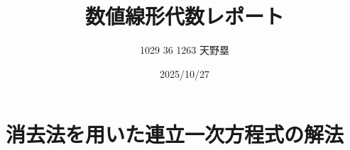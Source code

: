 \documentclass[uplatex,a4j]{jsarticle}
\title{数値線形代数レポート}
\author{1029 36 1263 天野塁}
\date{2025/10/27}
\begin{document}
\maketitle

\section{消去法を用いた連立一次方程式の解法}
\label{sec:q1}
\end{document}
